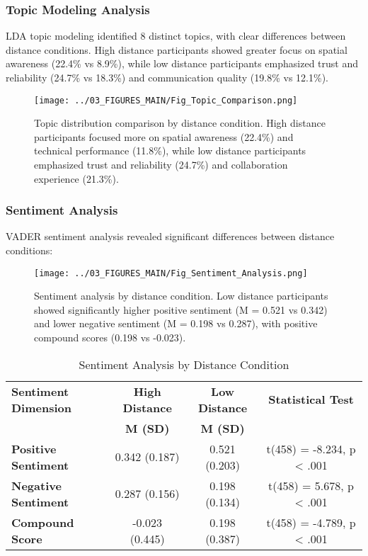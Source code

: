 \documentclass[12pt]{article}
\begin{document}
\subsubsection{Topic Modeling Analysis}

LDA topic modeling identified 8 distinct topics, with clear differences between distance conditions. High distance participants showed greater focus on spatial awareness (22.4\% vs 8.9\%), while low distance participants emphasized trust and reliability (24.7\% vs 18.3\%) and communication quality (19.8\% vs 12.1\%).

\begin{figure}[h]
\centering
\texttt{[image: ../03\_FIGURES\_MAIN/Fig\_Topic\_Comparison.png]}
\caption{Topic distribution comparison by distance condition. High distance participants focused more on spatial awareness (22.4\%) and technical performance (11.8\%), while low distance participants emphasized trust and reliability (24.7\%) and collaboration experience (21.3\%).}
\label{fig:topic_comparison}
\end{figure}

\subsubsection{Sentiment Analysis}

VADER sentiment analysis revealed significant differences between distance conditions:

\begin{figure}[h]
\centering
\texttt{[image: ../03\_FIGURES\_MAIN/Fig\_Sentiment\_Analysis.png]}
\caption{Sentiment analysis by distance condition. Low distance participants showed significantly higher positive sentiment (M = 0.521 vs 0.342) and lower negative sentiment (M = 0.198 vs 0.287), with positive compound scores (0.198 vs -0.023).}
\label{fig:sentiment_analysis}
\end{figure}

\begin{table}[h]
\centering
\caption{Sentiment Analysis by Distance Condition}
\begin{tabular}{@{}lccc@{}}
\toprule
\textbf{Sentiment Dimension} & \textbf{High Distance} & \textbf{Low Distance} & \textbf{Statistical Test} \\
& \textbf{M (SD)} & \textbf{M (SD)} & \\
\midrule
\textbf{Positive Sentiment} & 0.342 (0.187) & 0.521 (0.203) & t(458) = -8.234, p < .001 \\
\textbf{Negative Sentiment} & 0.287 (0.156) & 0.198 (0.134) & t(458) = 5.678, p < .001 \\
\textbf{Compound Score} & -0.023 (0.445) & 0.198 (0.387) & t(458) = -4.789, p < .001 \\
\bottomrule
\end{tabular}
\end{table}
\end{document}
